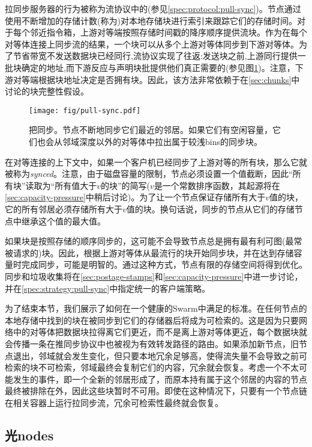 拉同步服务器的行为被称为流协议中的(参见\ref{spec:protocol:pull-sync})。节点通过使用不断增加的存储计数(称为)对本地存储块进行索引来跟踪它们的存储时间。对于每个邻近指令箱，上游对等端按照存储时间戳的降序顺序提供流块。作为在每个对等体连接上同步流的结果，一个块可以从多个上游对等体同步到下游对等体。为了节省带宽不发送数据块已经同行,流协议实现了往返:发送块之前,上游同行提供一批块确定的地址,而下游反应与声明块批提供他们真正需要的(参见图\ref{fig:pull-syncing})。注意，下游对等端根据块地址决定是否拥有块。因此，该方法非常依赖于在\ref{sec:chunks}中讨论的块完整性假设。


\begin{figure}[htbp]
   \centering
   \texttt{[image: fig/pull-sync.pdf]}
   \caption[把同步\statusgreen]{把同步。节点不断地同步它们最近的邻居。如果它们有空闲容量，它们也会从邻域深度以外的对等体中拉出属于较浅bins的同步块。}
   \label{fig:pull-syncing}
\end{figure}

在对等连接的上下文中，如果一个客户机已经同步了上游对等的所有块，那么它就被称为\emph{synced}。注意，由于磁盘容量的限制，节点必须设置一个值截断，因此“所有块”读取为“所有值大于$v$的块”的简写($v$是一个常数排序函数，其起源将在\ref{sec:capacity-pressure}中稍后讨论)。为了让一个节点保证存储所有大于$v$值的块，它的所有邻居必须存储所有大于$v$值的块。换句话说，同步的节点从它们的存储节点中继承这个值的最大值。 

如果块是按照存储的顺序同步的，这可能不会导致节点总是拥有最有利可图(最常被请求的)块。因此，根据上游对等体从最流行的块开始同步块，并在达到存储容量时完成同步，可能是明智的。通过这种方式，节点有限的存储空间将得到优化。同步和垃圾收集将在\ref{sec:postage-stamps}和\ref{sec:capacity-pressure}中进一步讨论，并在\ref{spec:strategy:pull-sync}中指定统一的客户端策略。

为了结束本节，我们展示了如何在一个健康的Swarm中满足的标准。在任何节点的本地存储中找到的块在被同步到它们的存储器后将成为可检索的。这是因为只要网络中的对等体把数据块拉得离它们更近，而不是离上游对等体更近，每个数据块就会传播一条在推同步协议中也被视为有效转发路径的路由。如果添加新节点，旧节点退出，邻域就会发生变化，但只要本地冗余足够高，使得流失量不会导致之前可检索的块不可检索，邻域最终会复制它们的内容，冗余就会恢复。考虑一个不太可能发生的事件，即一个全新的邻居形成了，而原本持有属于这个邻居的内容的节点最终被排除在外，因此这些块暂时不可用。即使在这种情况下，只要有一个节点链在相关容器上运行拉同步流，冗余可检索性最终就会恢复。

\subsection{光nodes\statusgreen}
\label{sec:light}

